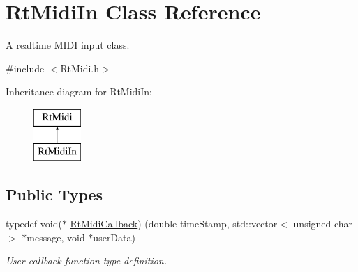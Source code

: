 \hypertarget{class_rt_midi_in}{}\section{Rt\+Midi\+In Class Reference}
\label{class_rt_midi_in}


A realtime M\+I\+DI input class.  




{\ttfamily \#include $<$Rt\+Midi.\+h$>$}

Inheritance diagram for Rt\+Midi\+In\+:\begin{figure}[H]
\begin{center}
\leavevmode
\includegraphics[height=2.000000cm]{class_rt_midi_in}
\end{center}
\end{figure}
\subsection*{Public Types}
\begin{DoxyCompactItemize}
\item 
typedef void($\ast$ \hyperlink{class_rt_midi_in_aac5c0da1ec6f97fe43d5189bad00caef}{Rt\+Midi\+Callback}) (double time\+Stamp, std\+::vector$<$ unsigned char $>$ $\ast$message, void $\ast$user\+Data)\hypertarget{class_rt_midi_in_aac5c0da1ec6f97fe43d5189bad00caef}{}\label{class_rt_midi_in_aac5c0da1ec6f97fe43d5189bad00caef}

\begin{DoxyCompactList}\small\item\em User callback function type definition. \end{DoxyCompactList}\end{DoxyCompactItemize}
